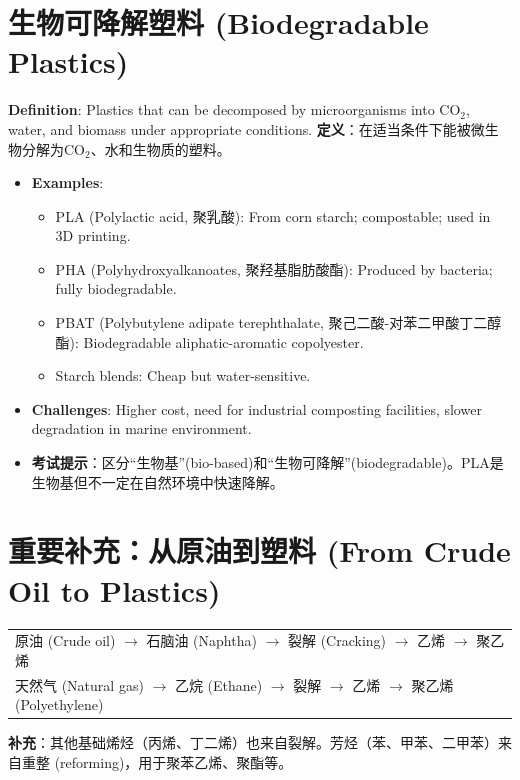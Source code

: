 \documentclass[12pt,a4paper]{ctexart}
\begin{document}
\section{生物可降解塑料 (Biodegradable Plastics)}
\textbf{Definition}: Plastics that can be decomposed by microorganisms into CO$_2$, water, and biomass under appropriate conditions.  
\textbf{定义}：在适当条件下能被微生物分解为CO$_2$、水和生物质的塑料。

\begin{itemize}
    \item \textbf{Examples}:
    \begin{itemize}
        \item PLA (Polylactic acid, 聚乳酸): From corn starch; compostable; used in 3D printing.
        \item PHA (Polyhydroxyalkanoates, 聚羟基脂肪酸酯): Produced by bacteria; fully biodegradable.
        \item PBAT (Polybutylene adipate terephthalate, 聚己二酸-对苯二甲酸丁二醇酯): Biodegradable aliphatic-aromatic copolyester.
        \item Starch blends: Cheap but water-sensitive.
    \end{itemize}
    \item \textbf{Challenges}: Higher cost, need for industrial composting facilities, slower degradation in marine environment.
    \item \textbf{考试提示}：区分“生物基”(bio-based)和“生物可降解”(biodegradable)。PLA是生物基但不一定在自然环境中快速降解。
\end{itemize}

\section{重要补充：从原油到塑料 (From Crude Oil to Plastics)}
\begin{center}
\begin{tabular}{l}
原油 (Crude oil) $\rightarrow$ 石脑油 (Naphtha) $\rightarrow$ 裂解 (Cracking) $\rightarrow$ 乙烯 $\rightarrow$ 聚乙烯 \\
天然气 (Natural gas) $\rightarrow$ 乙烷 (Ethane) $\rightarrow$ 裂解 $\rightarrow$ 乙烯 $\rightarrow$ 聚乙烯 (Polyethylene) \\
\end{tabular}
\end{center}
\textbf{补充}：其他基础烯烃（丙烯、丁二烯）也来自裂解。芳烃（苯、甲苯、二甲苯）来自重整 (reforming)，用于聚苯乙烯、聚酯等。
\end{document}
